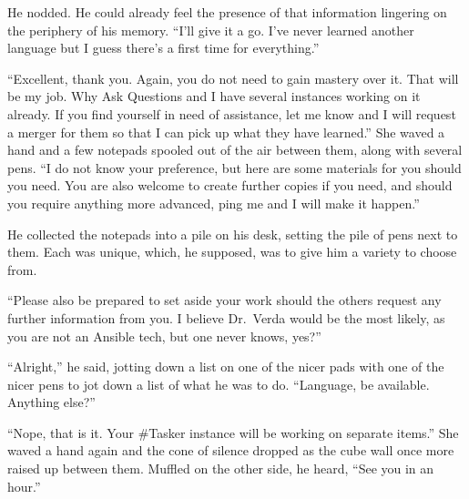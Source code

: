 He nodded. He could already feel the presence of that information lingering on the periphery of his memory. ``I'll give it a go. I've never learned another language but I guess there's a first time for everything.''

``Excellent, thank you. Again, you do not need to gain mastery over it. That will be my job. Why Ask Questions and I have several instances working on it already. If you find yourself in need of assistance, let me know and I will request a merger for them so that I can pick up what they have learned.'' She waved a hand and a few notepads spooled out of the air between them, along with several pens. ``I do not know your preference, but here are some materials for you should you need. You are also welcome to create further copies if you need, and should you require anything more advanced, ping me and I will make it happen.''

He collected the notepads into a pile on his desk, setting the pile of pens next to them. Each was unique, which, he supposed, was to give him a variety to choose from.

``Please also be prepared to set aside your work should the others request any further information from you. I believe Dr.~Verda would be the most likely, as you are not an Ansible tech, but one never knows, yes?''

``Alright,'' he said, jotting down a list on one of the nicer pads with one of the nicer pens to jot down a list of what he was to do. ``Language, be available. Anything else?''

``Nope, that is it. Your \#Tasker instance will be working on separate items.'' She waved a hand again and the cone of silence dropped as the cube wall once more raised up between them. Muffled on the other side, he heard, ``See you in an hour.''
